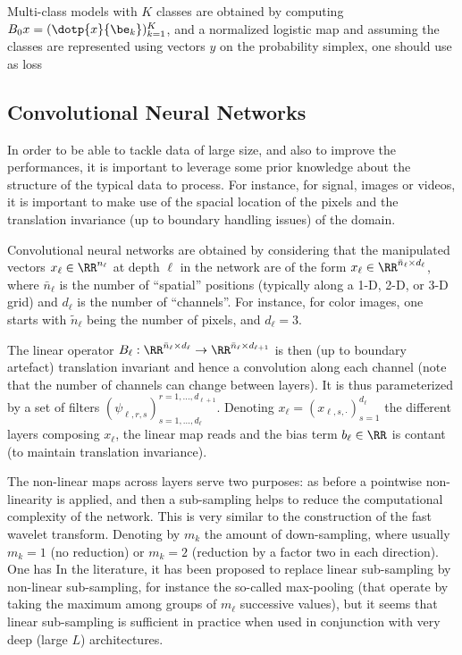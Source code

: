 Multi-class models with $K$ classes are obtained by computing $B_0 x = (\dotp{x}{\be_k})_{k=1}^K$, and a normalized logistic map 
and assuming the classes are represented using vectors $y$ on the probability simplex, one should use as loss

\subsection{Convolutional Neural Networks}
\label{sec-cnn}

In order to be able to tackle data of large size, and also to improve the performances, it is important to leverage some prior knowledge about the structure of the typical data to process. For instance, for signal, images or videos, it is important to make use of the spacial location of the pixels and the translation invariance (up to boundary handling issues) of the domain.

Convolutional neural networks are obtained by considering that the manipulated vectors $x_\ell \in \RR^{n_\ell}$ at depth $\ell$ in the network are of the form $x_\ell \in \RR^{ \bar n_\ell \times d_\ell }$, where $\bar n_\ell$ is the number of ``spatial'' positions (typically along a 1-D, 2-D, or 3-D grid) and $d_\ell$ is the number of ``channels''.
%
For instance, for color images, one starts with $\tilde n_\ell$ being the number of pixels, and $d_\ell=3$.

The linear operator $B_\ell : \RR^{ \bar n_\ell \times d_\ell } \rightarrow \RR^{ \bar n_\ell \times d_{\ell+1} }$ is then (up to boundary artefact) translation invariant and hence a convolution along each channel (note that the number of channels can change between layers). It is thus parameterized by a set of filters $( \psi_{\ell,r,s} )_{s=1,\ldots,d_{\ell}}^{r=1,\ldots,d_{\ell+1}}$. Denoting $x_\ell = ( x_{\ell,s,\cdot} )_{s=1}^{d_\ell}$ the different layers composing $x_\ell$, the linear map reads
and the bias term $b_\ell \in \RR$ is contant (to maintain translation invariance).

The non-linear maps across layers serve two purposes: as before a pointwise non-linearity is applied, and then a sub-sampling helps to reduce the computational complexity of the network. This is very similar to the construction of the fast wavelet transform. Denoting by $m_k$ the amount of down-sampling, where usually $m_k=1$ (no reduction) or $m_k=2$ (reduction by a factor two in each direction). One has
In the literature, it has been proposed to replace linear sub-sampling by non-linear sub-sampling, for instance the so-called max-pooling (that operate by taking the maximum among groups of $m_\ell$ successive values), but it seems that linear sub-sampling is sufficient in practice when used in conjunction with very deep (large $L$) architectures. 

